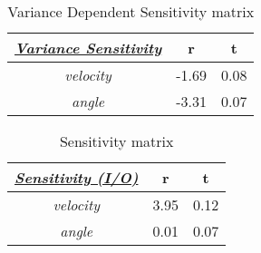 \begin{table}[h!]
\centering
\caption{Variance Dependent Sensitivity matrix}
\label{VarDepSensitivityComputed}
\begin{tabular}{|c|c|c|}
\hline
{\ul \textit{\textbf{Variance Sensitivity}}} & \textbf{r} & \textbf{t} \\ \hline
\textit{velocity}                     & -1.69   & 0.08   \\ \hline
\textit{angle}                        & -3.31   & 0.07   \\ \hline
\end{tabular}
\end{table}
\begin{table}[h!]
\centering
\caption{Sensitivity matrix}
\label{SensitivityComputed}
\begin{tabular}{|c|c|c|}
\hline
{\ul \textit{\textbf{Sensitivity (I/O)}}} & \textbf{r} & \textbf{t} \\ \hline
\textit{velocity}                     & 3.95   & 0.12   \\ \hline
\textit{angle}                        & 0.01   & 0.07   \\ \hline
\end{tabular}
\end{table}

